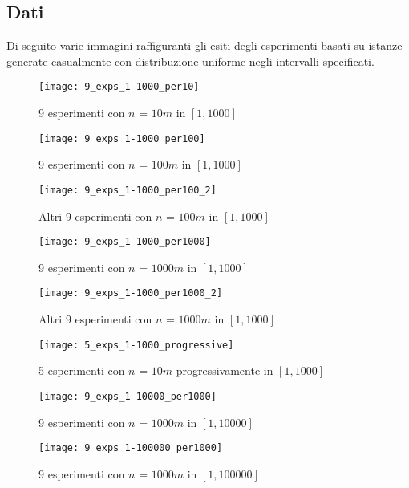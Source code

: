 \subsection{Dati}
Di seguito varie immagini raffiguranti gli esiti degli esperimenti basati su istanze generate casualmente con distribuzione uniforme negli intervalli specificati.
\begin{figure}[H]
	\caption{9 esperimenti con $ n $ = $ 10m $ in $ [1, 1000] $ }
	\label{sec:Exp1}
	\texttt{[image: 9\_exps\_1-1000\_per10]}
\end{figure}
\begin{figure}[H]
	\caption{9 esperimenti con $ n $ = $ 100m $ in $ [1, 1000] $ }
	\label{sec:Exp2}
	\texttt{[image: 9\_exps\_1-1000\_per100]}
\end{figure}
\renewcommand{\thefigure}{3.2.2}
\begin{figure}[H]
	\caption{Altri 9 esperimenti con $ n $ = $ 100m $ in $ [1, 1000] $ }
	\label{sec:Exp2.2}
	\texttt{[image: 9\_exps\_1-1000\_per100\_2]}
\end{figure}
\renewcommand{\thefigure}{3.3}
\begin{figure}[H]
	\caption{9 esperimenti con $ n $ = $ 1000m $ in $ [1, 1000] $ }
	\label{sec:Exp3}
	\texttt{[image: 9\_exps\_1-1000\_per1000]}
\end{figure}
\renewcommand{\thefigure}{3.3.2}
\begin{figure}[H]
	\caption{Altri 9 esperimenti con $ n $ = $ 1000m $ in $ [1, 1000] $ }
	\label{sec:Exp3.2}
	\texttt{[image: 9\_exps\_1-1000\_per1000\_2]}
\end{figure}
\renewcommand{\thefigure}{3.4}
\begin{figure}[H]
	\caption{5 esperimenti con $ n $ = $ 10m $ progressivamente in $ [1, 1000] $ }
	\label{sec:Exp4}
	\texttt{[image: 5\_exps\_1-1000\_progressive]}
\end{figure}
\renewcommand{\thefigure}{3.5}
\begin{figure}[H]
	\caption{9 esperimenti con $ n $ = $ 1000m $ in $ [1, 10000] $ }
	\label{sec:Exp5}
	\texttt{[image: 9\_exps\_1-10000\_per1000]}
\end{figure}
\renewcommand{\thefigure}{3.6}
\begin{figure}[H]
	\caption{9 esperimenti con $ n $ = $ 1000m $ in $ [1, 100000] $ }
	\label{sec:Exp6}
	\texttt{[image: 9\_exps\_1-100000\_per1000]}
\end{figure}

